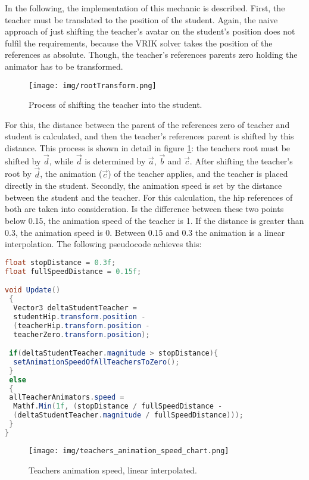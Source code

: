 In the following, the implementation of this mechanic is described. First, the teacher must be translated to the position of the student. Again, the naive approach of just shifting the teacher's avatar on the student's position does not fulfil the requirements, because the VRIK solver takes the position of the references as absolute. Though, the teacher's references parents zero holding the animator has to be transformed.
\begin{figure}
	\centering
	\texttt{[image: img/rootTransform.png]}
	\caption{Process of shifting the teacher into the student.}
	\label{fig:rootRansform}
\end{figure}

For this, the distance between the parent of the references zero of teacher and student is calculated, and then the teacher's references parent is shifted by this distance. This process is shown in detail in figure \ref{fig:rootRansform}: the teachers root must be shifted by $\vec{d}$, while $\vec{d}$ is determined by $\vec{a}$, $\vec{b}$ and $\vec{c}$. After shifting the teacher's root by $\vec{d}$, the animation ($\vec{c}$) of the teacher applies, and the teacher is placed directly in the student. Secondly, the animation speed is set by the distance between the student and the teacher. For this calculation, the hip references of both are taken into consideration. Is the difference between these two points below 0.15, the animation speed of the teacher is 1. If the distance is greater than 0.3, the animation speed is 0. Between 0.15 and 0.3 the animation is a linear interpolation. The following pseudocode achieves this:

\begin{lstlisting}[language=JAVA, frame=single]
float stopDistance = 0.3f;
float fullSpeedDistance = 0.15f;

void Update()
 {
  Vector3 deltaStudentTeacher =
  studentHip.transform.position -
  (teacherHip.transform.position -
  teacherZero.transform.position);

 if(deltaStudentTeacher.magnitude > stopDistance){
  setAnimationSpeedOfAllTeachersToZero();
 }
 else
 {
 allTeacherAnimators.speed =
  Mathf.Min(1f, (stopDistance / fullSpeedDistance - 
  (deltaStudentTeacher.magnitude / fullSpeedDistance)));
 }   
}
\end{lstlisting}

\begin{figure}
	\centering
	\texttt{[image: img/teachers\_animation\_speed\_chart.png]}
	\caption{Teachers animation speed, linear interpolated.}
	\label{fig:teachers_animation_speed_chart}
\end{figure}

